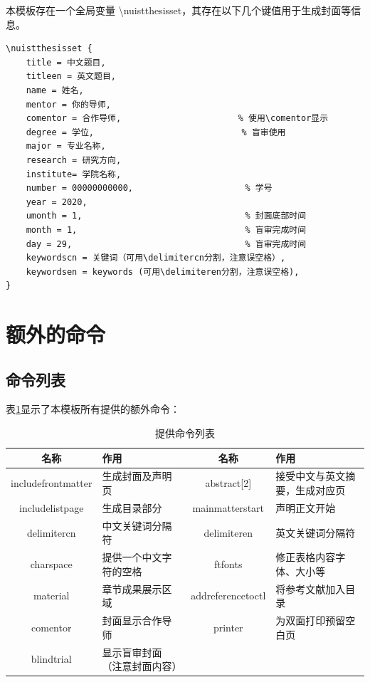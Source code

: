 \documentclass{nuistthesis}
\begin{document}
本模板存在一个全局变量 \textbackslash nuistthesisset，其存在以下几个键值用于生成封面等信息。
\begin{lstlisting}
\nuistthesisset {
    title = 中文题目,
    titleen = 英文题目,
    name = 姓名,
    mentor = 你的导师,
    comentor = 合作导师,                       % 使用\comentor显示
    degree = 学位,                             % 盲审使用 
    major = 专业名称,
    research = 研究方向,
    institute= 学院名称,
    number = 00000000000,                      % 学号
    year = 2020,
    umonth = 1,                                % 封面底部时间
    month = 1,                                 % 盲审完成时间
    day = 29,                                  % 盲审完成时间
    keywordscn = 关键词（可用\delimitercn分割，注意误空格）,
    keywordsen = keywords (可用\delimiteren分割，注意误空格),
}
\end{lstlisting}

\section{额外的命令}

\subsection{命令列表}

表\ref{tab:providecommand}显示了本模板所有提供的额外命令：

\begin{table}[htbp!]
\centering
\ftfonts
\caption{提供命令列表} \label{tab:providecommand}
    \begin{tabular}{c l | c l}
        \hline
        名称 & 作用 & 名称 & 作用\\
        \hline
        includefrontmatter & 生成封面及声明页 & abstract[2] & 接受中文与英文摘要，生成对应页 \\
        includelistpage & 生成目录部分 & mainmatterstart & 声明正文开始 \\
        delimitercn & 中文关键词分隔符 & delimiteren & 英文关键词分隔符 \\
        charspace & 提供一个中文字符的空格 & ftfonts & 修正表格内容字体、大小等 \\
        material & 章节成果展示区域 & addreferencetoctl & 将参考文献加入目录\\
        comentor & 封面显示合作导师 & printer & 为双面打印预留空白页 \\
        blindtrial & 显示盲审封面（注意封面内容）\\
        \hline
    \end{tabular}
\end{table}
\end{document}
